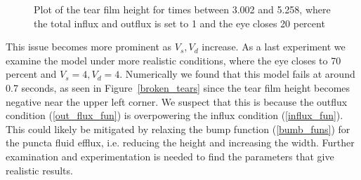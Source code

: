 \begin{figure}
	
	\caption{Plot of the tear film height for times between 3.002 and 5.258, where the total influx and outflux is set to 1 and the eye closes 20 percent}
	\label{tears_022}
\end{figure}

This issue becomes more prominent as $V_s,V_d$ increase. As a last experiment we examine the model under more realistic conditions, where the eye closes to 70 percent and $V_s=4,V_d=4$. Numerically we found that this model fails at around 0.7 seconds, as seen in Figure~\ref{broken_tears} since the tear film height becomes negative near the upper left corner. We suspect that this is because the outflux condition (\ref{out_flux_fun}) is overpowering the influx condition (\ref{influx_fun}). This could likely be mitigated by relaxing the bump function (\ref{bumb_funs}) for the puncta fluid efflux, i.e. reducing the height and increasing the width. Further examination and experimentation is needed to find the parameters that give realistic results.

